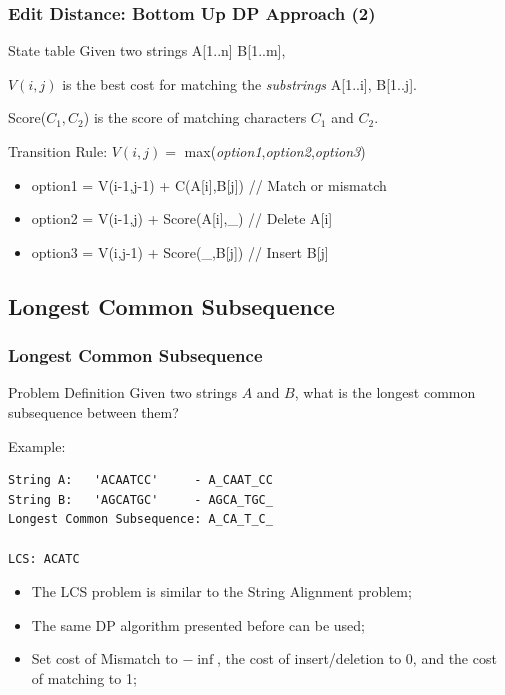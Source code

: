 \documentclass{beamer}
\begin{document}
\begin{frame}
  \frametitle{Edit Distance: Bottom Up DP Approach (2)}
  {\smaller
    \begin{block}{State table}
      Given two strings A[1..n] B[1..m],
      \smallskip

      $V(i,j)$ is the best cost for matching the \emph{substrings} A[1..i], B[1..j].
      \smallskip

      Score($C_1,C_2$) is the score of matching characters $C_1$ and $C_2$.
    \end{block}
    \begin{exampleblock}{Transition Rule:}
      $V(i,j) = $ max(\emph{option1},\emph{option2},\emph{option3})
      \begin{itemize}
      \item option1 = V(i-1,j-1) + C(A[i],B[j]) // Match or mismatch
      \item option2 = V(i-1,j) + Score(A[i],\_) // Delete A[i]
      \item option3 = V(i,j-1) + Score(\_,B[j]) // Insert B[j]
      \end{itemize}
    \end{exampleblock}


  }
\end{frame}


\subsection{Longest Common Subsequence}

\begin{frame}
  \frametitle{Longest Common Subsequence}
  {\smaller
    \begin{block}{Problem Definition}
      Given two strings $A$ and $B$, what is the longest common
      subsequence between them?

      \medskip
      
      Example:
\begin{verbatim}
String A:   'ACAATCC'     - A_CAAT_CC
String B:   'AGCATGC'     - AGCA_TGC_
Longest Common Subsequence: A_CA_T_C_

LCS: ACATC
\end{verbatim}
    \end{block}

    \begin{itemize}
    \item The LCS problem is similar to the String Alignment problem;
    \item The same DP algorithm presented before can be used;
    \item Set cost of Mismatch to $-\inf$, the cost of insert/deletion
      to 0, and the cost of matching to 1;
    \end{itemize}
  }
\end{frame}
\end{document}
